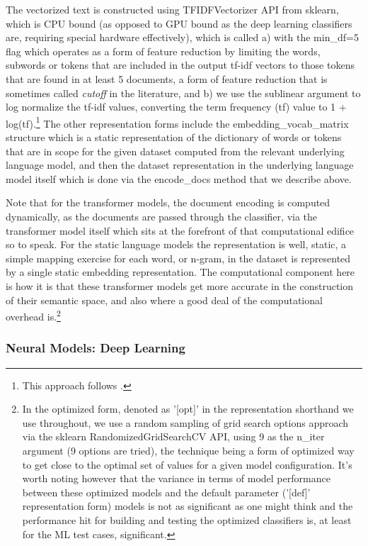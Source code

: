 \documentclass[final]{clv2025-revised}
\begin{document}
The vectorized text is constructed using TFIDFVectorizer API from sklearn, which is CPU bound (as opposed to GPU bound as the deep learning classifiers are, requiring special hardware effectively), which is called a) with the min\_df=5 flag which operates as a form of feature reduction by limiting the words, subwords or tokens that are included in the output tf-idf vectors to those tokens that are found in at least 5 documents, a form of feature reduction that is sometimes called \textit{cutoff} in the literature, and b) we use the sublinear argument to log normalize the tf-idf values, converting the term frequency (tf) value to 1 + log(tf).\footnote{This approach follows \cite{moreo2021}.} The other representation forms include the embedding\_vocab\_matrix structure which is a static representation of the dictionary of words or tokens that are in scope for the given dataset computed from the relevant underlying language model, and then the dataset representation in the underlying language model itself which is done via the encode\_docs method that we describe above. 

Note that for the transformer models, the document encoding is computed dynamically, as the documents are passed through the classifier, via the transformer model itself which sits at the forefront of that computational edifice so to speak. For the static language models the representation is well, static, a simple mapping exercise for each word, or n-gram, in the dataset is represented by a single static embedding representation. The computational component here is how it is that these transformer models get more accurate in the construction of their semantic space, and also where a good deal of the computational overhead is.\footnote{In the optimized form, denoted as '[opt]' in the representation shorthand we use throughout, we use a random sampling of grid search options approach via the sklearn RandomizedGridSearchCV API, using 9 as the n\_iter argument (9 options are tried), the technique being a form of optimized way to get close to the optimal set of values for a given model configuration. It's worth noting however that the variance in terms of model performance between these optimized models and the default parameter ('[def]' representation form) models is not as significant as one might think and the performance hit for building and testing the optimized classifiers is, at least for the ML test cases, significant.} 


\subsubsection{Neural Models: Deep Learning}
\end{document}

